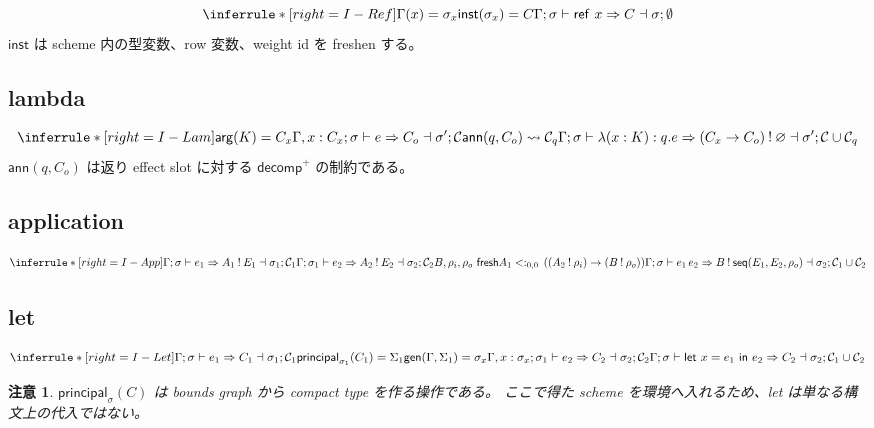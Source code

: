 \documentclass[uplatex,dvipdfmx,a4paper,11pt]{jsarticle}
\theoremstyle{jpplain}
\newtheorem{remark}[definition]{注意}
\newcommand{\fresh}{\mathsf{fresh}}
\newcommand{\eff}{\mathbin{!}}
\newcommand{\emptyrow}{\varnothing}
\newcommand{\subty}[3]{#1\mathrel{<:}_{#2,#3}}
\newcommand{\ann}{\mathsf{ann}}
\newcommand{\gen}{\mathsf{gen}}
\newcommand{\inst}{\mathsf{inst}}
\newcommand{\principal}{\mathsf{principal}}
\newcommand{\seqeff}{\mathsf{seq}}
\begin{document}
\[
\inferrule*[right=I-Ref]
 {\Gamma(x)=\sigma_x\\
  \inst(\sigma_x)=C}
 {\Gamma;\sigma\vdash \mathsf{ref}\ x\Rightarrow C\dashv\sigma;\emptyset}
\]
\(\inst\) は scheme 内の型変数、row 変数、weight id を freshen する。

\subsection{lambda}

\[
\inferrule*[right=I-Lam]
 {\mathsf{arg}(K)=C_x\\
  \Gamma,x:C_x;\sigma\vdash e\Rightarrow C_o\dashv\sigma';\mathcal C\\
  \ann(q,C_o)\leadsto \mathcal C_q}
 {\Gamma;\sigma\vdash \lambda(x:K):q.e
   \Rightarrow (C_x\to C_o)\eff\emptyrow
   \dashv\sigma';\mathcal C\cup\mathcal C_q}
\]
\(\ann(q,C_o)\) は返り effect slot に対する \(\mathsf{decomp}^{+}\) の制約である。

\subsection{application}

\[
\inferrule*[right=I-App]
 {\Gamma;\sigma\vdash e_1\Rightarrow A_1\eff E_1\dashv\sigma_1;\mathcal C_1\\
  \Gamma;\sigma_1\vdash e_2\Rightarrow A_2\eff E_2\dashv\sigma_2;\mathcal C_2\\
  B,\rho_i,\rho_o\ \fresh\\
  \subty{A_1}{0}{0}\,((A_2\eff\rho_i)\to(B\eff\rho_o))}
 {\Gamma;\sigma\vdash e_1\,e_2
   \Rightarrow B\eff\seqeff(E_1,E_2,\rho_o)
   \dashv\sigma_2;\mathcal C_1\cup\mathcal C_2}
\]

\subsection{let}

\[
\inferrule*[right=I-Let]
 {\Gamma;\sigma\vdash e_1\Rightarrow C_1\dashv\sigma_1;\mathcal C_1\\
  \principal_{\sigma_1}(C_1)=\Sigma_1\\
  \gen(\Gamma,\Sigma_1)=\sigma_x\\
  \Gamma,x:\sigma_x;\sigma_1\vdash e_2\Rightarrow C_2\dashv\sigma_2;\mathcal C_2}
 {\Gamma;\sigma\vdash \mathsf{let}\ x=e_1\ \mathsf{in}\ e_2
   \Rightarrow C_2\dashv\sigma_2;\mathcal C_1\cup\mathcal C_2}
\]

\begin{remark}
\(\principal_{\sigma}(C)\) は bounds graph から compact type を作る操作である。
ここで得た scheme を環境へ入れるため、let は単なる構文上の代入ではない。
\end{remark}
\end{document}
